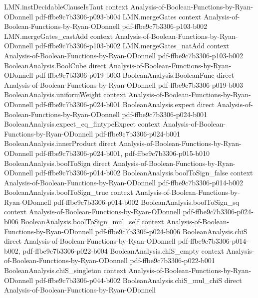 \begin{lemma}
  {LMN.instDecidableClauseIsTaut}
  {context}
  {Analysis-of-Boolean-Functions-by-Ryan-ODonnell}
  {pdf-ffbe9c7b3306-p093-b004}
\proofstep
  {LMN.mergeGates}
  {context}
  {Analysis-of-Boolean-Functions-by-Ryan-ODonnell}
  {pdf-ffbe9c7b3306-p103-b002}
\proofstep
  {LMN.mergeGates_castAdd}
  {context}
  {Analysis-of-Boolean-Functions-by-Ryan-ODonnell}
  {pdf-ffbe9c7b3306-p103-b002}
\proofstep
  {LMN.mergeGates_natAdd}
  {context}
  {Analysis-of-Boolean-Functions-by-Ryan-ODonnell}
  {pdf-ffbe9c7b3306-p103-b002}
\proofstep
  {BooleanAnalysis.BoolCube}
  {direct}
  {Analysis-of-Boolean-Functions-by-Ryan-ODonnell}
  {pdf-ffbe9c7b3306-p019-b003}
\proofstep
  {BooleanAnalysis.BooleanFunc}
  {direct}
  {Analysis-of-Boolean-Functions-by-Ryan-ODonnell}
  {pdf-ffbe9c7b3306-p019-b003}
\proofstep
  {BooleanAnalysis.uniformWeight}
  {context}
  {Analysis-of-Boolean-Functions-by-Ryan-ODonnell}
  {pdf-ffbe9c7b3306-p024-b001}
\proofstep
  {BooleanAnalysis.expect}
  {direct}
  {Analysis-of-Boolean-Functions-by-Ryan-ODonnell}
  {pdf-ffbe9c7b3306-p024-b001}
\proofstep
  {BooleanAnalysis.expect_eq_fintypeExpect}
  {context}
  {Analysis-of-Boolean-Functions-by-Ryan-ODonnell}
  {pdf-ffbe9c7b3306-p024-b001}
\proofstep
  {BooleanAnalysis.innerProduct}
  {direct}
  {Analysis-of-Boolean-Functions-by-Ryan-ODonnell}
  {pdf-ffbe9c7b3306-p024-b001,
    pdf-ffbe9c7b3306-p015-b010}
\proofstep
  {BooleanAnalysis.boolToSign}
  {direct}
  {Analysis-of-Boolean-Functions-by-Ryan-ODonnell}
  {pdf-ffbe9c7b3306-p014-b002}
\proofstep
  {BooleanAnalysis.boolToSign_false}
  {context}
  {Analysis-of-Boolean-Functions-by-Ryan-ODonnell}
  {pdf-ffbe9c7b3306-p014-b002}
\proofstep
  {BooleanAnalysis.boolToSign_true}
  {context}
  {Analysis-of-Boolean-Functions-by-Ryan-ODonnell}
  {pdf-ffbe9c7b3306-p014-b002}
\proofstep
  {BooleanAnalysis.boolToSign_sq}
  {context}
  {Analysis-of-Boolean-Functions-by-Ryan-ODonnell}
  {pdf-ffbe9c7b3306-p024-b006}
\proofstep
  {BooleanAnalysis.boolToSign_mul_self}
  {context}
  {Analysis-of-Boolean-Functions-by-Ryan-ODonnell}
  {pdf-ffbe9c7b3306-p024-b006}
\proofstep
  {BooleanAnalysis.chiS}
  {direct}
  {Analysis-of-Boolean-Functions-by-Ryan-ODonnell}
  {pdf-ffbe9c7b3306-p014-b002,
    pdf-ffbe9c7b3306-p022-b004}
\proofstep
  {BooleanAnalysis.chiS_empty}
  {context}
  {Analysis-of-Boolean-Functions-by-Ryan-ODonnell}
  {pdf-ffbe9c7b3306-p022-b001}
\proofstep
  {BooleanAnalysis.chiS_singleton}
  {context}
  {Analysis-of-Boolean-Functions-by-Ryan-ODonnell}
  {pdf-ffbe9c7b3306-p044-b002}
\proofstep
  {BooleanAnalysis.chiS_mul_chiS}
  {direct}
  {Analysis-of-Boolean-Functions-by-Ryan-ODonnell}

\end{lemma}
